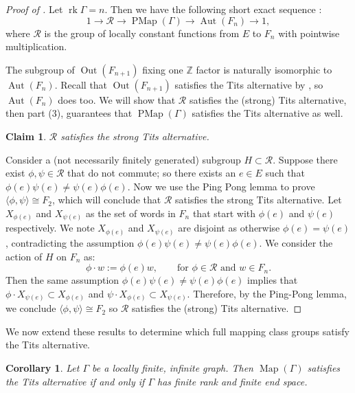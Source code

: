 \documentclass[11pt]{amsart}
\theoremstyle{plain}
\newtheorem{COR}[THM]{Corollary}
\newtheorem*{CLAIME}{Claim}
\theoremstyle{definition}
\DeclareMathOperator{\Aut}{Aut}
\DeclareMathOperator{\Out}{Out}
\DeclareMathOperator{\PMap}{PMap}
\DeclareMathOperator{\Map}{Map}
\DeclareMathOperator{\rk}{rk}
\newcommand{\Z}{\mathbb{Z}}
\newcommand{\cR}{\mathcal{R}}
\def\G{{\Gamma}}
\newcommand{\<}{\langle}
\renewcommand{\>}{\rangle}
\begin{document}
\begin{proof}[Proof of ]
    Let $\rk \G = n.$
    Then we have the following short exact sequence \cite[Theorem 3.5]{AB2021}:
    \[
        1 \longrightarrow \cR \longrightarrow \PMap(\G) \longrightarrow \Aut(F_n) \longrightarrow 1,
    \] where $\cR$ is the group of locally constant functions from $E$ to $F_n$ with pointwise multiplication.  

    The subgroup of $\Out(F_{n+1})$ fixing one $\Z$ factor is naturally isomorphic to $\Aut(F_n)$. Recall that $\Out(F_{n+1})$ satisfies the Tits alternative by \cite{BFH2000}, so $\Aut(F_n)$ does too.  We will show that $\cR$ satisfies the (strong) Tits alternative, then  part (3), guarantees that $\PMap(\G)$ satisfies the Tits alternative as well.
    
    \begin{CLAIME}
        $\cR$ satisfies the strong Tits alternative.
    \end{CLAIME}
    Consider a (not necessarily finitely generated) subgroup $H \subset \cR$. Suppose there exist $\phi, \psi \in \cR$ that do not commute; so there exists an $e \in E$ such that $\phi(e)\psi(e) \neq \psi(e) \phi(e)$. Now we use the Ping Pong lemma to prove $\< \phi, \psi \> \cong F_2$, which will conclude that $\cR$ satisfies the strong Tits alternative. Let $X_{\phi(e)}$ and $X_{\psi(e)}$ as the set of words in $F_n$ that start with $\phi(e)$ and $\psi(e)$ respectively. We note $X_{\phi(e)}$ and $X_{\psi(e)}$ are disjoint as otherwise $\phi(e)=\psi(e)$, contradicting the assumption $\phi(e)\psi(e) \neq \psi(e)\phi(e)$. We consider the action of $H$ on $F_n$ as:
    \[
        \phi \cdot w := \phi(e)w, \qquad \text{for $\phi \in \cR$ and $w \in F_n$}.
    \]
    Then the same assumption $\phi(e)\psi(e) \neq \psi(e) \phi(e)$ implies that $\phi \cdot X_{\psi(e)} \subset X_{\phi(e)}$ and $\psi \cdot X_{\phi(e)} \subset X_{\psi(e)}$. Therefore, by the Ping-Pong lemma, we conclude $\<\phi, \psi\> \cong F_2$ so $\cR$ satisfies the (strong) Tits alternative.
\end{proof}

We now extend these results to determine which full mapping class groups satisfy the Tits alternative. 

\begin{COR} \label{cor:FullMapTA}
    Let $\G$ be a locally finite, infinite graph.
    Then $\Map(\G)$ satisfies the Tits alternative if and only if $\G$ has finite rank and finite end space.
\end{COR}
\end{document}

